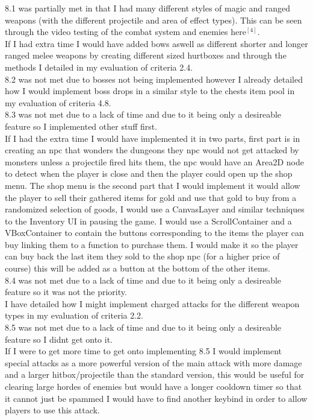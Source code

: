\documentclass{article}
\begin{document}
        8.1 was partially met in that I had many different styles of magic and ranged weapons (with the different projectile and area of effect types). This can be seen through the video testing of the combat system and enemies here$^{[4]}$.\\
        If I had extra time I would have added bows aswell as different shorter and longer ranged melee weapons by creating different sized hurtboxes and through the methods I detailed in my evaluation of criteria 2.4.\\ 
        8.2 was not met due to bosses not being implemented however I already detailed how I would implement boss drops in a similar style to the chests item pool in my evaluation of criteria 4.8.\\
        8.3 was not met due to a lack of time and due to it being only a desireable feature so I implemented other stuff first.\\
        If I had the extra time I would have implemented it in two parts, first part is in creating an npc that wonders the dungeons they npc would not get attacked by monsters unless a projectile fired hits them, the npc would have an Area2D node to detect when the player is close and then the player could open up the shop menu. The shop menu is the second part that I would implement it would allow the player to sell their gathered items for gold and use that gold to buy from a randomized selection of goods, I would use a CanvasLayer and similar techniques to the Inventory UI in pausing the game. I would use a ScrollContainer and a VBoxContainer to contain the buttons corresponding to the items the player can buy linking them to a function to purchase them. I would make it so the player can buy back the last item they sold to the shop npc (for a higher price of course) this will be added as a button at the bottom of the other items.\\
        8.4 was not met due to a lack of time and due to it being only a desireable feature so it was not the priority.\\
        I have detailed how I might implement charged attacks for the different weapon types in my evaluation of criteria 2.2.\\
        8.5 was not met due to a lack of time and due to it being only a desireable feature so I didnt get onto it.\\
        If I were to get more time to get onto implementing 8.5 I would implement special attacks as a more powerful version of the main attack with more damage and a larger hitbox/projectile than the standard version, this would be useful for clearing large hordes of enemies but would have a longer cooldown timer so that it cannot just be spammed I would have to find another keybind in order to allow players to use this attack.\\
\end{document}
